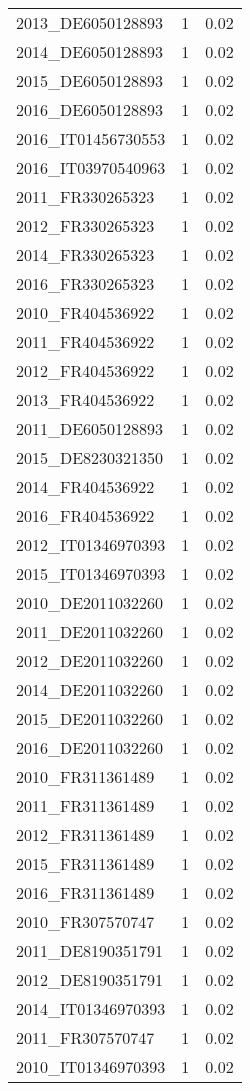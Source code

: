 \begin{table*}[htbp]
\begin{tabular}{lrr}
2013_DE6050128893 & 1 & 0.02 \\
2014_DE6050128893 & 1 & 0.02 \\
2015_DE6050128893 & 1 & 0.02 \\
2016_DE6050128893 & 1 & 0.02 \\
2016_IT01456730553 & 1 & 0.02 \\
2016_IT03970540963 & 1 & 0.02 \\
2011_FR330265323 & 1 & 0.02 \\
2012_FR330265323 & 1 & 0.02 \\
2014_FR330265323 & 1 & 0.02 \\
2016_FR330265323 & 1 & 0.02 \\
2010_FR404536922 & 1 & 0.02 \\
2011_FR404536922 & 1 & 0.02 \\
2012_FR404536922 & 1 & 0.02 \\
2013_FR404536922 & 1 & 0.02 \\
2011_DE6050128893 & 1 & 0.02 \\
2015_DE8230321350 & 1 & 0.02 \\
2014_FR404536922 & 1 & 0.02 \\
2016_FR404536922 & 1 & 0.02 \\
2012_IT01346970393 & 1 & 0.02 \\
2015_IT01346970393 & 1 & 0.02 \\
2010_DE2011032260 & 1 & 0.02 \\
2011_DE2011032260 & 1 & 0.02 \\
2012_DE2011032260 & 1 & 0.02 \\
2014_DE2011032260 & 1 & 0.02 \\
2015_DE2011032260 & 1 & 0.02 \\
2016_DE2011032260 & 1 & 0.02 \\
2010_FR311361489 & 1 & 0.02 \\
2011_FR311361489 & 1 & 0.02 \\
2012_FR311361489 & 1 & 0.02 \\
2015_FR311361489 & 1 & 0.02 \\
2016_FR311361489 & 1 & 0.02 \\
2010_FR307570747 & 1 & 0.02 \\
2011_DE8190351791 & 1 & 0.02 \\
2012_DE8190351791 & 1 & 0.02 \\
2014_IT01346970393 & 1 & 0.02 \\
2011_FR307570747 & 1 & 0.02 \\
2010_IT01346970393 & 1 & 0.02 \\

\end{tabular}
\end{table*}
